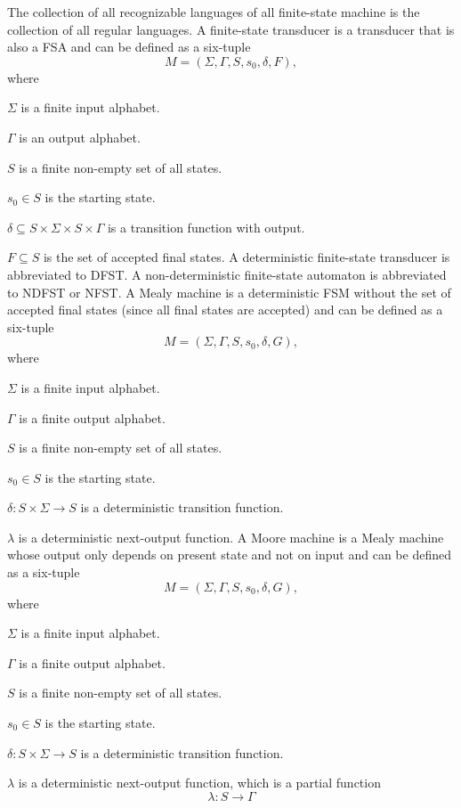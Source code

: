 \documentclass[a4paper,12pt]{article}
\begin{document}
 The collection of all recognizable languages of all finite-state machine is the collection of all regular languages.
A finite-state transducer is a transducer that is also a FSA and can be defined as a six-tuple
\[M=(\Sigma,\Gamma,S,s_0,\delta,F),\]
where
\bit
\item $\Sigma$ is a finite input alphabet.
\item $\Gamma$ is an output alphabet.
\item $S$ is a finite non-empty set of all states.
\item $s_0\in S$ is the starting state.
\item $\delta\subseteq S\times\Sigma\times S\times\Gamma$ is a transition function with output.
\item $F\subseteq S$ is the set of accepted final states.
\eit
A deterministic finite-state transducer is abbreviated to DFST. A non-deterministic finite-state automaton is abbreviated to NDFST or NFST.
A Mealy machine is a deterministic FSM without the set of accepted final states (since all final states are accepted) and can be defined as a six-tuple
\[M=(\Sigma,\Gamma,S,s_0,\delta,G),\]
where
\bit
\item $\Sigma$ is a finite input alphabet.
\item $\Gamma$ is a finite output alphabet.
\item $S$ is a finite non-empty set of all states.
\item $s_0\in S$ is the starting state.
\item $\delta\colon S\times\Sigma\to S$ is a deterministic transition function.
\item $\lambda$ is a deterministic next-output function.
\eit
{}
A Moore machine is a Mealy machine whose output only depends on present state and not on input and can be defined as a six-tuple
\[M=(\Sigma,\Gamma,S,s_0,\delta,G),\]
where
\bit
\item $\Sigma$ is a finite input alphabet.
\item $\Gamma$ is a finite output alphabet.
\item $S$ is a finite non-empty set of all states.
\item $s_0\in S$ is the starting state.
\item $\delta\colon S\times\Sigma\to S$ is a deterministic transition function.
\item $\lambda$ is a deterministic next-output function, which is a partial function
\[\lambda\colon S\to\Gamma\]
\end{document}
